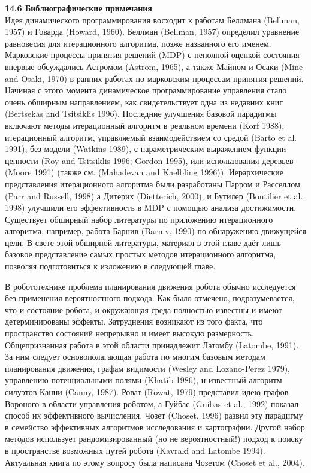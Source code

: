 \documentclass[10pt,a4paper]{article}
\begin{document}
\textbf{14.6	Библиографические примечания}\\

Идея динамического программирования восходит к работам Беллмана (Bellman, 1957) и Говарда (Howard, 1960). Беллман (Bellman, 1957) определил уравнение равновесия для итерационного алгоритма, позже  названного его именем. Марковские процессы принятия решений (MDP) с неполной оценкой состояния впервые обсуждались Астромом (Astrom, 1965), а также Майном и Осаки (Mine and Osaki, 1970) в ранних работах по марковским процессам принятия решений. Начиная с этого момента динамическое программирование управления стало очень обширным направлением, как свидетельствует одна из недавних книг (Bertsekas and Tsitsiklis 1996). Последние улучшения базовой парадигмы включают методы итерационный алгоритм в реальном времени (Korf 1988), итерационный алгоритм, управляемый взаимодействием со средой (Barto et al. 1991), без модели (Watkins 1989), с параметрическим выражением функции ценности (Roy and Tsitsiklis 1996; Gordon 1995), или использования деревьев (Moore 1991) (также см. (Mahadevan and Kaelbling 1996)). Иерархические представления итерационного алгоритма были разработаны Парром и Расселлом (Parr and Russell, 1998) а Дитерих (Dietterich, 2000), и Бутилер (Boutilier et al., 1998) улучшили его эффективность в MDP с помощью анализа достижимости. Существует обширный набор литературы по приложению итерационного алгоритма, например, работа Барнив (Barniv, 1990) по обнаружению движущейся цели. В свете этой обширной литературы, материал в этой главе даёт лишь базовое представление самых простых методов итерационного алгоритма, позволяя подготовиться к изложению в следующей главе.

В робототехнике проблема планирования движения робота обычно исследуется без применения вероятностного подхода. Как было отмечено, подразумевается, что и состояние робота, и окружающая среда полностью известны и имеют детерминированы эффекты. Затруднения возникают из того факта, что пространство состояний непрерывно и имеет высокую размерность. Общепризнанная работа в этой области принадлежит Латомбу (Latombe, 1991). За ним следует основополагающая работа по многим базовым методам планирования движения, графам видимости (Wesley and Lozano-Perez 1979), управлению потенциальными полями (Khatib 1986), и известный алгоритм силуэтов Канни (Canny, 1987). Роват (Rowat, 1979) представил идею графов Вороного в области управления роботом, а Гуйбас (Guibas et al., 1992) показал способ их эффективного вычисления. Чозет (Choset, 1996) развил эту парадигму в семейство эффективных алгоритмов исследования и картографии. Другой набор методов использует рандомизированный (но не вероятностный!) подход к поиску в пространстве возможных путей робота (Kavraki and Latombe 1994). Актуальная книга по этому вопросу была написана Чозетом (Choset et al., 2004).
\end{document}

